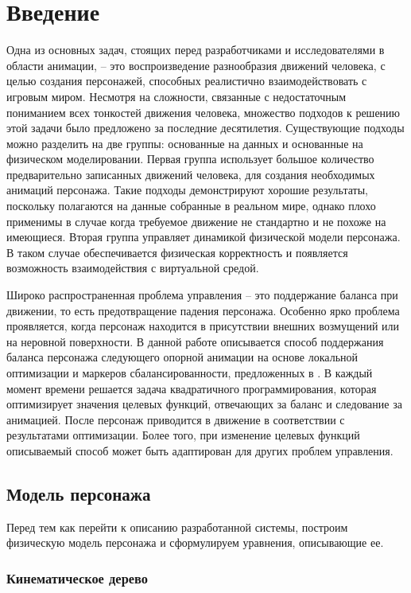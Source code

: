 \section{Введение}

Одна из основных задач, стоящих перед разработчиками и исследователями в области анимации, -- это воспроизведение разнообразия движений человека, с целью  создания персонажей, способных реалистично взаимодействовать с игровым миром. Несмотря на сложности, связанные с недостаточным пониманием всех тонкостей движения человека, множество подходов к решению этой задачи было предложено за последние десятилетия. Существующие подходы можно разделить на две группы: основанные на данных и основанные на физическом моделировании. Первая группа использует большое количество предварительно записанных движений человека, для создания необходимых анимаций персонажа. Такие подходы демонстрируют хорошие результаты, поскольку полагаются на данные собранные в реальном мире, однако плохо применимы в случае когда требуемое движение не стандартно и не похоже на имеющиеся. Вторая группа управляет динамикой физической модели персонажа. В таком случае обеспечивается физическая корректность и появляется возможность взаимодействия с виртуальной средой.

Широко распространенная проблема управления -- это поддержание баланса при движении, то есть предотвращение падения персонажа. Особенно ярко проблема проявляется, когда персонаж находится в присутствии внешних возмущений или на неровной поверхности. В данной работе описывается способ поддержания баланса персонажа следующего опорной анимации на основе локальной оптимизации и маркеров сбалансированности, предложенных в \cite{MacchiettoZS}. В каждый момент времени решается задача квадратичного программирования, которая оптимизирует значения целевых функций, отвечающих за баланс и следование за анимацией. После персонаж приводится в движение в соответствии с результатами оптимизации. Более того, при изменение целевых функций описываемый способ может быть адаптирован для других проблем управления.

\subsection{Модель персонажа}

Перед тем как перейти к описанию разработанной системы, построим физическую модель персонажа и сформулируем уравнения, описывающие ее.

\subsubsection{Кинематическое дерево}

